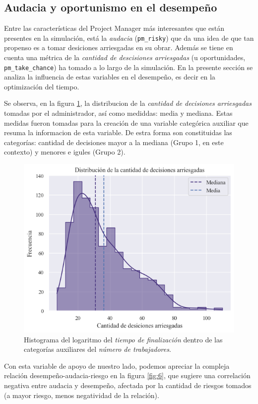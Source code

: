 \documentclass[a4paper, 12pt]{article}
\begin{document}
\subsection{Audacia y oportunismo en el desempeño}
	Entre las características del Project Manager más interesantes que están presentes en la simulación, está la \emph{audacia} (\texttt{pm\_risky}) que da una idea de que tan propenso es a tomar desiciones arriesgadas en su obrar. Además se tiene en cuenta una métrica de la \emph{cantidad de descisiones arriesgadas} (u oportunidades, \texttt{pm\_take\_chance}) ha tomado a lo largo de la simulación. En la presente sección se analiza la influencia de estas variables en el desempeño, es decir en la optimización del tiempo.
	 
	 Se observa, en la figura \ref{fig:5}, la distribucion de la \emph{cantidad de decisiones arriesgadas} tomadas por el administrador, así como mediddas: media y mediana. Estas medidas fueron tomadas para la creación de una variable categórica auxiliar que resuma la informacion de esta variable. De estra forma son constituidas las categorías: cantidad de decisiones mayor a la mediana (Grupo 1, en este contexto) y menores e igules (Grupo 2).

	\begin{figure}[htb!]
		\centering
		\includegraphics[height = .50\linewidth, width=.50\linewidth]{assets/take_chance_dist}
		\caption{Histograma del logaritmo del  \emph{tiempo de finalización} dentro de las categorías auxiliares del \emph{número de trabajadores}.}
		\label{fig:5}
	\end{figure}
	
	Con esta variable de apoyo de nuestro lado, podemos apreciar la compleja relación desempeño-audacia-riesgo en la figura \ref{fig:6}, que sugiere una correlación negativa entre audacia y desempeño, afectada por la cantidad de riesgos tomados (a mayor riesgo, menos negatividad de la relación).
	
\end{document}
